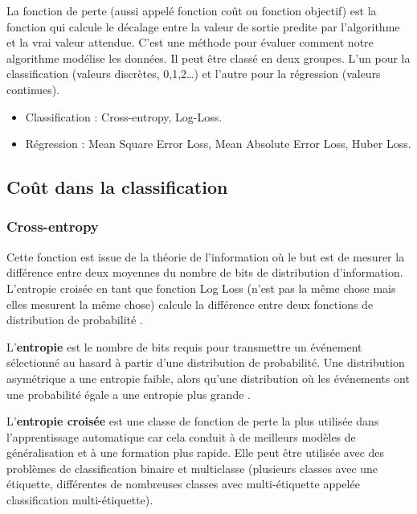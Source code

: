 		La fonction de perte (aussi appelé fonction coût ou fonction objectif) est la fonction qui calcule le décalage entre la valeur de sortie predite par l'algorithme et la vrai valeur attendue. C'est une méthode pour évaluer comment notre algorithme modélise les données. Il peut être classé en deux groupes. L'un pour la classification (valeurs discrètes, 0,1,2…) et l'autre pour la régression (valeurs continues).
		\begin{itemize}
			\item Classification :  Cross-entropy, Log-Loss.
			\item Régression :  Mean Square Error Loss, Mean Absolute Error Loss, Huber Loss.
		\end{itemize}
		
			
	\subsection{Coût dans la classification}
		\subsubsection{\textbf{Cross-entropy}}
		
		Cette fonction est issue de la théorie de l'information où le but est de mesurer la différence entre deux moyennes du nombre de bits de distribution d'information. L'entropie croisée en tant que fonction Log Loss (n’est pas la même chose mais elles mesurent la même chose) calcule la différence entre deux fonctions de distribution de probabilité \cite{bishop2006pattern, geron2017hands}.
		
		L'\textbf{entropie} est le nombre de bits requis pour transmettre un événement sélectionné au hasard à partir d'une distribution de probabilité. Une distribution asymétrique a une entropie faible, alors qu'une distribution où les événements ont une probabilité égale a une entropie plus grande \cite{goodfellow2016deep}.
		
		L'\textbf{entropie croisée} est une classe de fonction de perte la plus utilisée dans l'apprentissage automatique car cela conduit à de meilleurs modèles de généralisation et à une formation plus rapide.
		Elle peut être utilisée avec des problèmes de classification binaire et multiclasse \cite{geron2017hands} (plusieurs classes avec une étiquette, différentes de nombreuses classes avec multi-étiquette appelée classification multi-étiquette).
		

